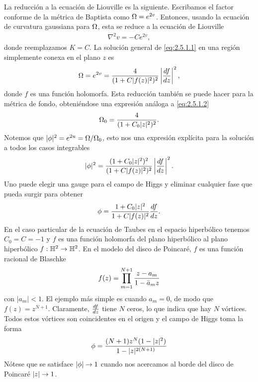  La reducción a la ecuación de Liouville es la siguiente. Escribamos el factor conforme de la métrica de Baptista como $\Omega=e^{2v}$. Entonces, usando la ecuación de curvatura gaussiana para $\Omega$, esta se reduce a la ecuación de Liouville
 \begin{align}
	 \nabla^2 v=-Ce^{2v}, \label{eq:2.5.1.1}
 \end{align}
 donde reemplazamos $K=C$. La solución general de \eqref{eq:2.5.1.1} en una región simplemente conexa en el plano $z$ es
 \begin{align}
	 \Omega = e^{2v} = \frac{4}{(1+C|f(z)|^2)^2}\left|\frac{df}{dz}\right|^2, \label{eq:2.5.1.2}
 \end{align}
 donde $f$ es una función holomorfa. Esta reducción también se puede hacer para la métrica de fondo, obteniéndose una expresión análoga a \eqref{eq:2.5.1.2}
 \begin{align}
	 \Omega_0 = \frac{4}{(1+C_0|z|^2)^2}. \label{eq:2.5.1.3}
 \end{align}
 Notemos que $|\phi|^2 = e^{2u}=\Omega/\Omega_0$, esto nos una expresión explícita para la solución a todos los casos integrables
 \begin{align}
	 |\phi|^2 = \frac{(1+C_0|z|^2)^2}{(1+C|f(z)|^2)^2}\left|\frac{df}{dz}\right|^2. \label{eq:2.5.1.4}
 \end{align}
 Uno puede elegir una gauge para el campo de Higgs y eliminar cualquier fase que pueda surgir para obtener
 \begin{align}
	 \phi = \frac{1+C_0|z|^2}{1+C|f(z)|^2}\frac{df}{dz}. \label{eq:2.5.1.5}
 \end{align}
En el caso particular de la ecuación de Taubes en el espacio hiperbólico tenemos $C_0=C=-1$ y $f$ es una función holomorfa del plano hiperbólico al plano hiperbólico $f:\mathbb{H}^2\rightarrow\mathbb{H}^2$. En el modelo del disco de Poincaré, $f$ es una función racional de Blaschke
\begin{align}
	f(z) = \prod_{m=1}^{N+1}\frac{z-a_m}{1-\bar a_m z} \label{eq:2.5.1.6}
\end{align}
 con $|a_m|<1$. El ejemplo más simple es cuando $a_m=0$, de modo que $f(z)=z^{N+1}$. Claramente, $\frac{df}{dz}$ tiene $N$ ceros, lo que indica que hay $N$ vórtices. Todos estos vórtices son coincidentes en el origen y el campo de Higgs toma la forma
 \begin{align}
	 \phi = \frac{(N+1)z^N(1-|z|^2)}{1-|z|^{2(N+1)}} \label{eq:2.5.1.7}
 \end{align}
 Nótese que se satisface $|\phi|\rightarrow 1$ cuando nos acercamos al borde del disco de Poincaré $|z|\rightarrow 1$. 
 

